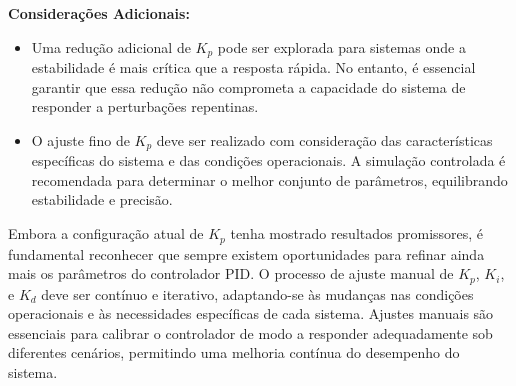 \vspace{0.4cm}
\textbf{Considerações Adicionais:}
\begin{itemize}
    \item Uma redução adicional de \(K_p\) pode ser explorada para sistemas onde a estabilidade é mais crítica que a resposta rápida. No entanto, é essencial garantir que essa redução não comprometa a capacidade do sistema de responder a perturbações repentinas.
    \item O ajuste fino de \(K_p\) deve ser realizado com consideração das características específicas do sistema e das condições operacionais. A simulação controlada é recomendada para determinar o melhor conjunto de parâmetros, equilibrando estabilidade e precisão.
\end{itemize}

Embora a configuração atual de \(K_p\) tenha mostrado resultados promissores, é fundamental reconhecer que sempre existem oportunidades para refinar ainda mais os parâmetros do controlador PID. O processo de ajuste manual de \(K_p\), \(K_i\), e \(K_d\) deve ser contínuo e iterativo, adaptando-se às mudanças nas condições operacionais e às necessidades específicas de cada sistema. Ajustes manuais são essenciais para calibrar o controlador de modo a responder adequadamente sob diferentes cenários, permitindo uma melhoria contínua do desempenho do sistema.
